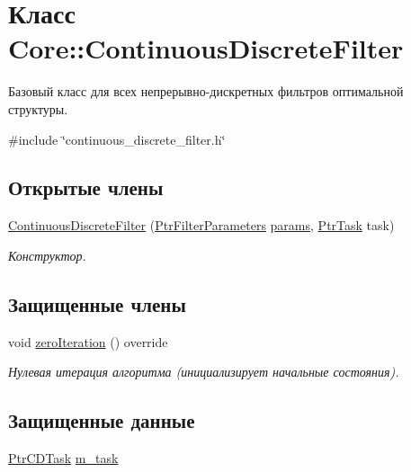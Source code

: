 \hypertarget{class_core_1_1_continuous_discrete_filter}{}\section{Класс Core\+:\+:Continuous\+Discrete\+Filter}
\label{class_core_1_1_continuous_discrete_filter}


Базовый класс для всех непрерывно-\/дискретных фильтров оптимальной структуры.  




{\ttfamily \#include \char`\"{}continuous\+\_\+discrete\+\_\+filter.\+h\char`\"{}}

\subsection*{Открытые члены}
\begin{DoxyCompactItemize}
\item 
\hypertarget{class_core_1_1_continuous_discrete_filter_a07811c4d421be2383961078cd07e6d96}{}\label{class_core_1_1_continuous_discrete_filter_a07811c4d421be2383961078cd07e6d96} 
\hyperlink{class_core_1_1_continuous_discrete_filter_a07811c4d421be2383961078cd07e6d96}{Continuous\+Discrete\+Filter} (\hyperlink{namespace_core_a4811af8148ba137d644b9a61a042cf03}{Ptr\+Filter\+Parameters} \hyperlink{class_core_1_1_filter_a44aa749b49ba46256975ce545531ecf7}{params}, \hyperlink{namespace_core_abfda8f69fcacfcea2696549b548ed737}{Ptr\+Task} task)
\begin{DoxyCompactList}\small\item\em Конструктор. \end{DoxyCompactList}\end{DoxyCompactItemize}
\subsection*{Защищенные члены}
\begin{DoxyCompactItemize}
\item 
void \hyperlink{class_core_1_1_continuous_discrete_filter_acc9b18241a13d46dc92ef1f02ec13e53}{zero\+Iteration} () override
\begin{DoxyCompactList}\small\item\em Нулевая итерация алгоритма (инициализирует начальные состояния). \end{DoxyCompactList}\end{DoxyCompactItemize}
\subsection*{Защищенные данные}
\begin{DoxyCompactItemize}
\item 
\hyperlink{namespace_core_a4d5939b0284102299f3fb63d7552826a}{Ptr\+C\+D\+Task} \hyperlink{class_core_1_1_continuous_discrete_filter_a14b9176c461ca407005e653ecc987b1b}{m\+\_\+task}
\end{DoxyCompactItemize}


